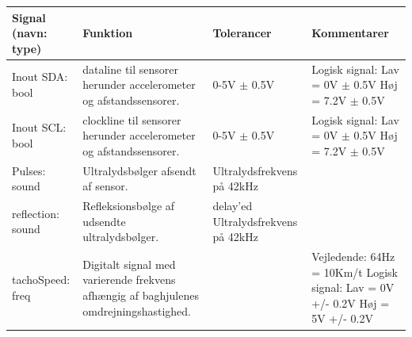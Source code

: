 \begin{table}[h]
	\centering
	\begin{tabularx}{\textwidth}{|l|X|X|X|} \hline
	\textbf{Signal (navn: type)} & \textbf{Funktion} & \textbf{Tolerancer} & \textbf{Kommentarer} \\ \hline
Inout SDA: bool
	& \IIC dataline til sensorer herunder accelerometer og afstandssensorer. 
	& 0-5V $\pm$ 0.5V
 	& Logisk signal: \newline
		Lav = 0V $\pm$ 0.5V \newline
		Høj = 7.2V $\pm$ 0.5V
	\\ \hline

Inout SCL: bool
	& \IIC clockline  til sensorer herunder accelerometer og afstandssensorer. 
	& 0-5V $\pm$ 0.5V
 	& Logisk signal: \newline
		Lav = 0V $\pm$ 0.5V \newline
		Høj = 7.2V $\pm$ 0.5V
	\\ \hline

Pulses: sound
	& Ultralydsbølger afsendt af sensor. 
	& Ultralydsfrekvens på 42kHz
 	& ~
	\\ \hline
	
reflection: sound
	& Refleksionsbølge af udsendte ultralydsbølger. 
	& delay'ed Ultralydsfrekvens på 42kHz
 	& ~
	\\ \hline
	
tachoSpeed: freq
	& Digitalt signal med varierende frekvens afhængig af baghjulenes omdrejningshastighed.
	& ~
	& Vejledende: \newline
		64Hz = 10Km/t \newline
		Logisk signal: \newline
		Lav = 0V +/- 0.2V \newline
		Høj = 5V +/- 0.2V	\\ \hline
	\end{tabularx}
\end{table}